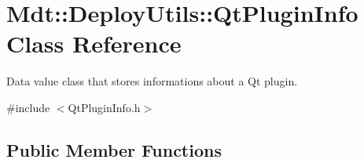 \hypertarget{class_mdt_1_1_deploy_utils_1_1_qt_plugin_info}{}\section{Mdt\+:\+:Deploy\+Utils\+:\+:Qt\+Plugin\+Info Class Reference}
\label{class_mdt_1_1_deploy_utils_1_1_qt_plugin_info}


Data value class that stores informations about a Qt plugin.  




{\ttfamily \#include $<$Qt\+Plugin\+Info.\+h$>$}

\subsection*{Public Member Functions}
